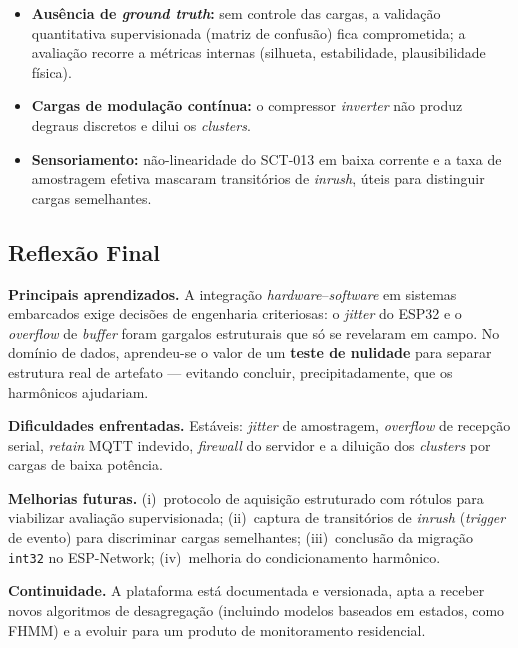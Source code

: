 \documentclass[12pt,a4paper]{article}
\begin{document}
\begin{itemize}[nosep]
  \item \textbf{Aus\^encia de \textit{ground truth}:} sem controle das cargas, a
  valida\c{c}\~ao quantitativa supervisionada (matriz de confus\~ao) fica
  comprometida; a avalia\c{c}\~ao recorre a m\'etricas internas (silhueta,
  estabilidade, plausibilidade f\'isica).
  \item \textbf{Cargas de modula\c{c}\~ao cont\'inua:} o compressor \textit{inverter}
  n\~ao produz degraus discretos e dilui os \textit{clusters}.
  \item \textbf{Sensoriamento:} n\~ao-linearidade do SCT-013 em baixa corrente e a
  taxa de amostragem efetiva mascaram transit\'orios de \textit{inrush}, \'uteis
  para distinguir cargas semelhantes.
\end{itemize}

\subsection{Reflex\~ao Final}

\textbf{Principais aprendizados.} A integra\c{c}\~ao \textit{hardware}--\textit{software}
em sistemas embarcados exige decis\~oes de engenharia criteriosas: o \textit{jitter}
do ESP32 e o \textit{overflow} de \textit{buffer} foram gargalos estruturais que
s\'o se revelaram em campo. No dom\'inio de dados, aprendeu-se o valor de um
\textbf{teste de nulidade} para separar estrutura real de artefato --- evitando
concluir, precipitadamente, que os harm\^onicos ajudariam.

\textbf{Dificuldades enfrentadas.} Est\'aveis: \textit{jitter} de amostragem,
\textit{overflow} de recep\c{c}\~ao serial, \textit{retain} MQTT indevido,
\textit{firewall} do servidor e a dilui\c{c}\~ao dos \textit{clusters} por cargas
de baixa pot\^encia.

\textbf{Melhorias futuras.} (i)~protocolo de aquisi\c{c}\~ao estruturado com
r\'otulos para viabilizar avalia\c{c}\~ao supervisionada; (ii)~captura de
transit\'orios de \textit{inrush} (\textit{trigger} de evento) para discriminar
cargas semelhantes; (iii)~conclus\~ao da migra\c{c}\~ao \texttt{int32} no
ESP-Network; (iv)~melhoria do condicionamento harm\^onico.

\textbf{Continuidade.} A plataforma est\'a documentada e versionada, apta a receber
novos algoritmos de desagrega\c{c}\~ao (incluindo modelos baseados em estados, como
FHMM) e a evoluir para um produto de monitoramento residencial.
\end{document}
